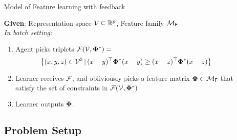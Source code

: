 \begin{algorithm}[t]
\caption{Model of Feature learning with feedback}
\label{alg: main}
\textbf{Given}: Representation space ${\mathcal{V}} \subseteq \mathbb{R}^p$, Feature family ${\mathcal{M}}_{\mathsf{F}}$\vspace{2mm}\\
\textit{In batch setting:}
\begin{enumerate}
    \item Agent picks triplets ${\mathcal{F}}({\mathcal{V}}, \boldsymbol{\Phi}^*) = $\vspace{-2mm} $$\hspace{-7mm}\curlybracket{(x,y,z) \in \cV^3 \,|\, (x-y)^{\top}\pphi^*(x-y) \ge (x-z)^{\top}\pphi^*(x-z)}\vspace{-2mm}$$
    \item Learner receives ${\mathcal{F}}$, and obliviously picks a feature matrix $\boldsymbol{\Phi} \in {\mathcal{M}}_{\mathsf{F}}$ that satisfy the set of constraints in ${\mathcal{F}}({\mathcal{V}}, \boldsymbol{\Phi}^*)$\vspace{-2mm}
    \item Learner outputs $\boldsymbol{\Phi}$.\vspace{-2mm}
\end{enumerate}
\end{algorithm}

\iffalse
\subsection{Problem Setup}\label{sec: setup}
    
